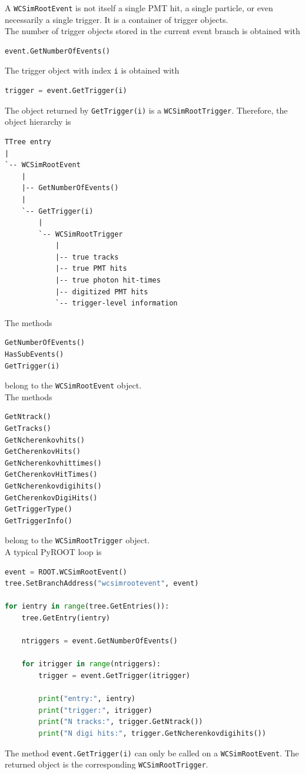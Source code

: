 \documentclass{article}
\numberwithin{table}{subsection}
\numberwithin{figure}{subsection}
\numberwithin{equation}{subsection}
\numberwithin{footnote}{subsection}
\begin{document}
A \texttt{WCSimRootEvent} is not itself a single PMT hit, a single particle, or
even necessarily a single trigger. It is a container of trigger objects.\\
The number of trigger objects stored in the current event branch is obtained with
\begin{lstlisting}[language=python]
event.GetNumberOfEvents()
\end{lstlisting}
The trigger object with index \texttt{i} is obtained with
\begin{lstlisting}[language=python]
trigger = event.GetTrigger(i)
\end{lstlisting}
The object returned by \texttt{GetTrigger(i)} is a
\texttt{WCSimRootTrigger}.
Therefore, the object hierarchy is
\begin{lstlisting}
TTree entry
|
`-- WCSimRootEvent
    |
    |-- GetNumberOfEvents()
    |
    `-- GetTrigger(i)
        |
        `-- WCSimRootTrigger
            |
            |-- true tracks
            |-- true PMT hits
            |-- true photon hit-times
            |-- digitized PMT hits
            `-- trigger-level information
\end{lstlisting}
The methods
\begin{lstlisting}[language=python]
GetNumberOfEvents()
HasSubEvents()
GetTrigger(i)
\end{lstlisting}
belong to the \texttt{WCSimRootEvent} object.\\
The methods
\begin{lstlisting}[language=python]
GetNtrack()
GetTracks()
GetNcherenkovhits()
GetCherenkovHits()
GetNcherenkovhittimes()
GetCherenkovHitTimes()
GetNcherenkovdigihits()
GetCherenkovDigiHits()
GetTriggerType()
GetTriggerInfo()
\end{lstlisting}
belong to the \texttt{WCSimRootTrigger} object.\\
\newline
A typical PyROOT loop is
\begin{lstlisting}[language=python]
event = ROOT.WCSimRootEvent()
tree.SetBranchAddress("wcsimrootevent", event)

for ientry in range(tree.GetEntries()):
    tree.GetEntry(ientry)

    ntriggers = event.GetNumberOfEvents()

    for itrigger in range(ntriggers):
        trigger = event.GetTrigger(itrigger)

        print("entry:", ientry)
        print("trigger:", itrigger)
        print("N tracks:", trigger.GetNtrack())
        print("N digi hits:", trigger.GetNcherenkovdigihits())
\end{lstlisting}
The method \texttt{event.GetTrigger(i)} can only be called on a
\texttt{WCSimRootEvent}. The returned object is the corresponding
\texttt{WCSimRootTrigger}.
\end{document}
